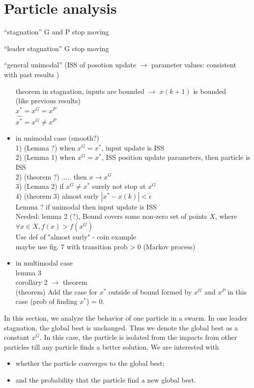 \section{Particle analysis}
\label{sec:particle}

``stagnation'' G and P stop moving

``leader stagnation'' G stop moving

``general unimodal'' (ISS of posotion update $ \rightarrow $ parameter values: consistent with past results )
\begin{itemize}
\item [theorem] in stagnation, inputs are bounded $ \rightarrow $ $ x(k+1) $ is bounded \\
(like previous results) \\
$  x^{*} = x^{G} = x^{P} $ \\
$  \hat{x^{*}} = x^{G} \not = x^{P} $
\item in unimodal case (smooth?)  \\
1) (Lemma ?) when $ x^{G} = x^{*} $, input update is ISS \\
2) (Lemma 1) when $ x^{G} = x^{*} $, ISS position update parameters, then particle is ISS \\
2) (theorem ?) ..... then $ x \rightarrow x^{G} $ \\
3) (Lemma 2) if $ x^{G} \not = x^{*} $ surely not stop at $ x^{G} $ \\
4) (theorem 3) almost surly $ | x^{*} - x(k) | < \epsilon $ \\
Lemma ? if unimodal then input update is ISS \\
Needed: lemma 2 (?), Bound covers some non-zero set of points $ X $, where $ \forall x \in X, f(x) > f(x^{G}) $ \\
Use def of "almost surly" - coin example \\
maybe use fig. 7 with transition prob > 0 (Markov process) 
\item in multimodal case \\
lemma 3 \\
corollary 2 $ \rightarrow $ theorem \\
(theorem) Add the case for $ x^{*} $ outside of bound formed by $ x^{G} $ and $ x^{P} $ in this case (prob of finding $ x^{*} $) = 0.
\end{itemize}

\bigskip
\bigskip
\bigskip
\bigskip

In this section, we analyze the behavior of one particle in a swarm.
In one leader stagnation, the global best is unchanged.
Thus we denote the global best as a constant $ x^{G} $.
In this case, the particle is isolated from the impacts from other particles till any particle finds a better solution.
We are interested with 
\begin{itemize}
\item whether the particle converges to the global best;
\item and the probability that the particle find a new global best.
\end{itemize}

